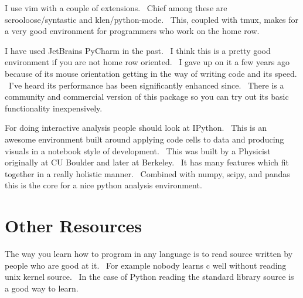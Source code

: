 \documentclass[]{article}
\begin{document}
I use vim with a couple of extensions. ~Chief among these are
scrooloose/syntastic and klen/python-mode. ~This, coupled with tmux,
makes for a very good environment for programmers who work on the home
row.

I have used JetBrains PyCharm in the past. ~I think this is a pretty
good environment if you are not home row oriented. ~I gave up on it a
few years ago because of its mouse orientation getting in the way of
writing code and its speed. ~I've heard its performance has been
significantly enhanced since. ~There is a community and commercial
version of this package so you can try out its basic functionality
inexpensively.

For doing interactive analysis people should look at IPython. ~This is
an awesome environment built around applying code cells to data and
producing visuals in a notebook style of development. ~This was built by
a Physicist originally at CU Boulder and later at Berkeley. ~It has many
features which fit together in a really holistic manner. ~Combined with
numpy, scipy, and pandas this is the core for a nice python analysis
environment.

\section{Other Resources}

The way you learn how to program in any language is to read source
written by people who are good at it. ~For example nobody learns c well
without reading unix kernel source. ~In the case of Python reading the
standard library source is a good way to learn.
\end{document}

